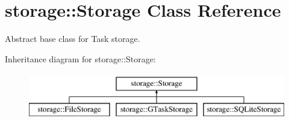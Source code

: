 \hypertarget{classstorage_1_1Storage}{
\section{storage\-:\-:\-Storage \-Class \-Reference}
\label{classstorage_1_1Storage}
}


\-Abstract base class for \-Task storage.  


\-Inheritance diagram for storage\-:\-:\-Storage\-:\begin{figure}[H]
\begin{center}
\leavevmode
\includegraphics[height=2.000000cm]{classstorage_1_1Storage}
\end{center}
\end{figure}
